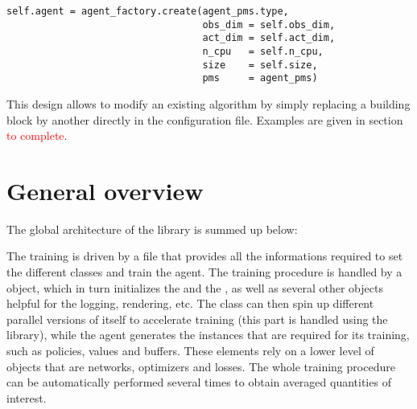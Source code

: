 \begin{verbatim}
self.agent = agent_factory.create(agent_pms.type,
                                  obs_dim = self.obs_dim,
                                  act_dim = self.act_dim,
                                  n_cpu   = self.n_cpu,
                                  size    = self.size,
                                  pms     = agent_pms)
\end{verbatim}

This design allows to modify an existing algorithm by simply replacing a building block by another directly in the  configuration file. Examples are given in section \textcolor{red}{to complete}.

\section{General overview}
\label{section:general_overview}

The global architecture of the library is summed up below:



The training is driven by a  file that provides all the informations required to set the different classes and train the agent. The training procedure is handled by a  object, which in turn initializes the  and the , as well as several other objects helpful for the logging, rendering, etc. The  class can then spin up different parallel versions of itself to accelerate training (this part is handled using the  library), while the agent generates the instances that are required for its training, such as policies, values and buffers. These elements rely on a lower level of objects that are networks, optimizers and losses. The whole training procedure can be automatically performed several times to obtain averaged quantities of interest.
